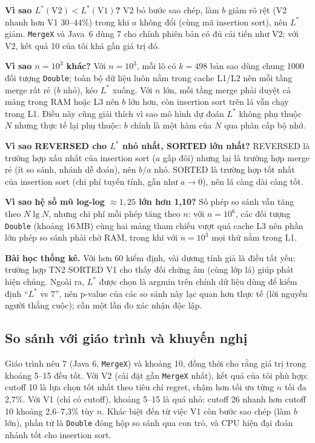 \documentclass[11pt,a4paper]{article}
\begin{document}
\textbf{Vì sao $L^*(\mathrm{V2}) < L^*(\mathrm{V1})$?} V2 bỏ bước sao chép, làm $b$ giảm rõ rệt (V2 nhanh hơn V1 30--44\%)
trong khi $a$ không đổi (cùng mã insertion sort), nên $L^*$ giảm. \texttt{MergeX} và Java~6 dùng 7 cho chính phiên bản có
đủ cải tiến như V2; với V2, kết quả 10 của tôi khá gần giá trị đó.

\textbf{Vì sao $n = 10^3$ khác?} Với $n = 10^3$, mỗi lô có $k = 498$ bản sao dùng chung 1000 đối tượng \texttt{Double};
toàn bộ dữ liệu luôn nằm trong cache L1/L2 nên mỗi tầng merge rất rẻ ($b$ nhỏ), kéo $L^*$ xuống. Với $n$ lớn, mỗi tầng merge
phải duyệt cả mảng trong RAM hoặc L3 nên $b$ lớn hơn, còn insertion sort trên lá vẫn chạy trong L1. Điều này cũng giải thích
vì sao mô hình dự đoán $L^*$ không phụ thuộc $N$ nhưng thực tế lại phụ thuộc: $b$ chính là một hàm của $N$ qua phân cấp bộ nhớ.

\textbf{Vì sao REVERSED cho $L^*$ nhỏ nhất, SORTED lớn nhất?} REVERSED là trường hợp xấu nhất của insertion sort ($a$ gấp đôi)
nhưng lại là trường hợp merge rẻ (ít so sánh, nhánh dễ đoán), nên $b/a$ nhỏ. SORTED là trường hợp tốt nhất của insertion sort
(chi phí tuyến tính, gần như $a \to 0$), nên lá càng dài càng tốt.

\textbf{Vì sao hệ số mũ log-log $\approx 1{,}25$ lớn hơn 1,10?} Số phép so sánh vẫn tăng theo $N\lg N$, nhưng chi phí mỗi phép
tăng theo $n$: với $n = 10^6$, các đối tượng \texttt{Double} (khoảng 16\,MB) cùng hai mảng tham chiếu vượt quá cache L3 nên phần
lớn phép so sánh phải chờ RAM, trong khi với $n = 10^3$ mọi thứ nằm trong L1.

\textbf{Bài học thống kê.} Với hơn 60 kiểm định, vài dương tính giả là điều tất yếu; trường hợp TN2 SORTED V1 cho thấy đối chứng
âm (cùng lớp lá) giúp phát hiện chúng. Ngoài ra, $L^*$ được chọn là argmin trên chính dữ liệu dùng để kiểm định ``$L^*$ vs 7'',
nên p-value của các so sánh này lạc quan hơn thực tế (lời nguyền người thắng cuộc); cần một lần đo xác nhận độc lập.

\subsection{So sánh với giáo trình và khuyến nghị}
Giáo trình nêu 7 (Java 6, \texttt{MergeX}) và khoảng 10, đồng thời cho rằng giá trị trong khoảng 5--15 đều tốt.
Với V2 (cài đặt gần \texttt{MergeX} nhất), kết quả của tôi phù hợp: cutoff 10 là lựa chọn tốt nhất theo tiêu chí regret,
chậm hơn tối ưu từng $n$ tối đa 2,7\%. Với V1 (chỉ có cutoff), khoảng 5--15 là quá nhỏ: cutoff 26 nhanh hơn cutoff 10 khoảng
2,6--7,3\% tùy $n$. Khác biệt đến từ việc V1 còn bước sao chép (làm $b$ lớn), phần tử là \texttt{Double} đóng hộp so sánh qua con trỏ,
và CPU hiện đại đoán nhánh tốt cho insertion sort.
\end{document}

